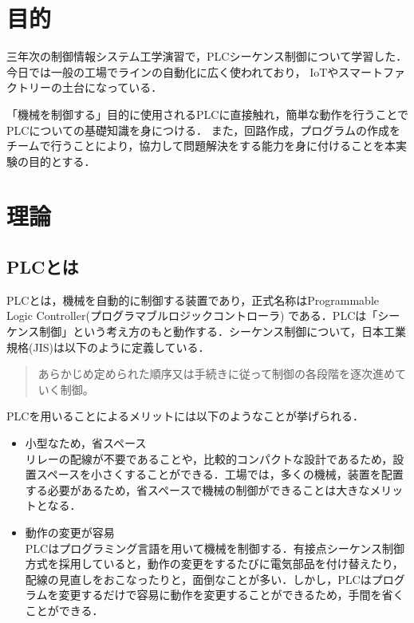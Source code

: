 \documentclass[a4paper,11pt]{jsarticle}
\begin{document}


\section{目的}
三年次の制御情報システム工学演習で，PLCシーケンス制御について学習した．今日では一般の工場でラインの自動化に広く使われており，
IoTやスマートファクトリーの土台になっている．\par
「機械を制御する」目的に使用されるPLCに直接触れ，簡単な動作を行うことでPLCについての基礎知識を身につける．
また，回路作成，プログラムの作成をチームで行うことにより，協力して問題解決をする能力を身に付けることを本実験の目的とする．

\section{理論}
\subsection{PLCとは}
PLCとは，機械を自動的に制御する装置であり，正式名称はProgrammable Logic Controller(プログラマブルロジックコントローラ)
である．PLCは「シーケンス制御」という考え方のもと動作する．シーケンス制御について，日本工業規格(JIS)は以下のように定義している．~\cite{JIS}
\begin{quote}
  あらかじめ定められた順序又は手続きに従って制御の各段階を逐次進めていく制御。
\end{quote}
PLCを用いることによるメリットには以下のようなことが挙げられる．
\begin{itemize}
  \item 小型なため，省スペース \\
        リレーの配線が不要であることや，比較的コンパクトな設計であるため，設置スペースを小さくすることができる．工場では，多くの機械，装置を配置する必要があるため，省スペースで機械の制御ができることは大きなメリットとなる．
  \item 動作の変更が容易\\
        PLCはプログラミング言語を用いて機械を制御する．有接点シーケンス制御方式を採用していると，動作の変更をするたびに電気部品を付け替えたり，配線の見直しをおこなったりと，面倒なことが多い．しかし，PLCはプログラムを変更するだけで容易に動作を変更することができるため，手間を省くことができる．
\end{itemize}
\end{document}
